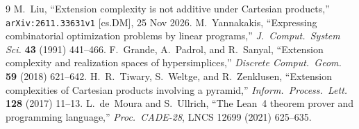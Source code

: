 \documentclass[10pt,twocolumn]{article}
\begin{document}
\begin{thebibliography}{9}
 M.~Liu, ``Extension complexity is not additive under Cartesian products,'' \texttt{arXiv:2611.33631v1} [cs.DM], 25 Nov 2026.
 M.~Yannakakis, ``Expressing combinatorial optimization problems by linear programs,'' \textit{J.\ Comput.\ System Sci.} \textbf{43} (1991) 441--466.
 F.~Grande, A.~Padrol, and R.~Sanyal, ``Extension complexity and realization spaces of hypersimplices,'' \textit{Discrete Comput.\ Geom.} \textbf{59} (2018) 621--642.
 H.~R.~Tiwary, S.~Weltge, and R.~Zenklusen, ``Extension complexities of Cartesian products involving a pyramid,'' \textit{Inform.\ Process.\ Lett.} \textbf{128} (2017) 11--13.
 L.~de~Moura and S.~Ullrich, ``The Lean~4 theorem prover and programming language,'' \textit{Proc.\ CADE-28}, LNCS 12699 (2021) 625--635.
\end{thebibliography}
\end{document}
